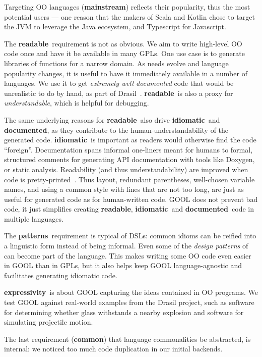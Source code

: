 \documentclass[sigplan,screen,10pt]{acmart}
\newcommand{\abbrev}[1]{\textbf{#1}}
\newcommand{\mainstream}{\abbrev{mainstream}}
\newcommand{\readable}{\abbrev{readable}}
\newcommand{\idiomatic}{\abbrev{idiomatic}}
\newcommand{\documented}{\abbrev{documented}}
\newcommand{\oopatterns}{\abbrev{patterns}}
\newcommand{\common}{\abbrev{common}}
\newcommand{\expressivity}{\abbrev{expressivity}}
\begin{document}
Targeting OO languages (\mainstream) reflects their popularity,
thus the most potential users --- one reason that the makers
of Scala and Kotlin chose to target the JVM to leverage the Java ecosystem, and
Typescript for Javascript.

The \readable~requirement is not as obvious.  We aim to write
high-level OO code once and have it be available in many GPLs. One use case
is to generate libraries of functions for a narrow domain. As needs
evolve and language popularity changes, it is useful to have it immediately
available in a number of languages. We use it to get \emph{extremely well
documented} code that would be unrealistic to do by hand, as part of
Drasil~\cite{SzymczakEtAl2016, Drasil2019}. \readable~is 
also a proxy for \emph{understandable}, which is helpful for debugging.

The same underlying reasons for \readable~also drive \idiomatic~and \documented,
as they contribute to the human-understandability of the generated code.
\idiomatic~is important as readers would otherwise find the code ``foreign''.
Documentation spans informal one-liners meant for humans to
formal, structured comments for generating API documentation with tools
like Doxygen, or static analysis.
Readability (and thus understandability) are improved when code is 
pretty-printed~\cite{buse2009learning}. Thus layout, redundant parentheses,
well-chosen variable names, and using a common style with lines that are not too
long, are just as useful for generated code as for human-written code.
GOOL does not prevent bad code, it just simplifies creating \readable,
\idiomatic~and \documented~code in multiple languages.

The \oopatterns~requirement is typical of DSLs: common idioms
can be reified into a linguistic form instead of being
informal. Even some of the \emph{design patterns} of~\cite{gamma1995design}
can become part of the language. This makes writing some OO
code even easier in GOOL than in GPLs, but it also helps
keep GOOL language-agnostic and facilitates generating idiomatic code.

\expressivity~is about GOOL capturing
the ideas contained in OO programs.  We test 
GOOL against real-world examples from the Drasil project, such as 
software for determining whether glass withstands a nearby explosion and 
software for simulating projectile motion.

The last requirement (\common) that language commonalities be abstracted, is
internal: we noticed too much code duplication in our initial
backends.
\end{document}

